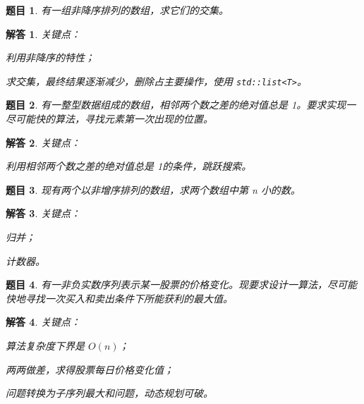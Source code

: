 \documentclass[UTF8, final]{ctexart}
\newtheorem{question}{题目}
\newtheorem{solution}{解答}
\begin{document}
\begin{question}
有一组非降序排列的数组，求它们的交集。
\end{question}
\begin{solution}
关键点：
\begin{compactitem}
    \item 利用非降序的特性；
    \item 求交集，最终结果逐渐减少，删除占主要操作，使用 \lstinline[style = lcpp]|std::list<T>|。
\end{compactitem}

\end{solution}

\begin{question}
有一整型数据组成的数组，相邻两个数之差的绝对值总是 1。要求实现一尽可能快的算法，寻找元素第一次出现的位置。
\end{question}
\begin{solution}
关键点：
\begin{compactitem}
    \item 利用\emph{相邻两个数之差的绝对值总是 1}的条件，跳跃搜索。
\end{compactitem}

\end{solution}

\begin{question}
现有两个以非增序排列的数组，求两个数组中第 n 小的数。
\end{question}
\begin{solution}
关键点：
\begin{compactitem}
    \item 归并；
    \item 计数器。
\end{compactitem}

\end{solution}

\begin{question}
\label{q:stocks}
有一非负实数序列表示某一股票的价格变化。现要求设计一算法，尽可能快地寻找一次买入和卖出条件下所能获利的最大值。
\end{question}
\begin{solution}
关键点：
\begin{compactitem}
    \item 算法复杂度下界是 $O(n)$；
    \item 两两做差，求得股票每日价格变化值；
    \item 问题转换为子序列最大和问题，动态规划可破。
\end{compactitem}

\end{solution}
\end{document}
